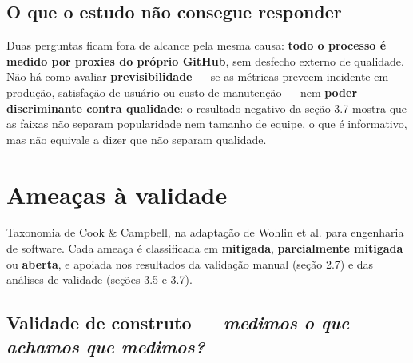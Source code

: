 \documentclass[12pt]{article}
\begin{document}
\subsection{O que o estudo não consegue responder}

Duas perguntas ficam fora de alcance pela mesma causa: \textbf{todo o processo é medido por proxies do próprio GitHub}, sem desfecho externo de qualidade. Não há como avaliar \textbf{previsibilidade} — se as métricas preveem incidente em produção, satisfação de usuário ou custo de manutenção — nem \textbf{poder discriminante contra qualidade}: o resultado negativo da seção 3.7 mostra que as faixas não separam popularidade nem tamanho de equipe, o que é informativo, mas não equivale a dizer que não separam qualidade.


\section{Ameaças à validade}

Taxonomia de Cook \& Campbell, na adaptação de Wohlin et al. para engenharia de software. Cada ameaça é classificada em \textbf{mitigada}, \textbf{parcialmente mitigada} ou \textbf{aberta}, e apoiada nos resultados da validação manual (seção 2.7) e das análises de validade (seções 3.5 e 3.7).

\subsection{Validade de construto — \emph{medimos o que achamos que medimos?}}
\end{document}
